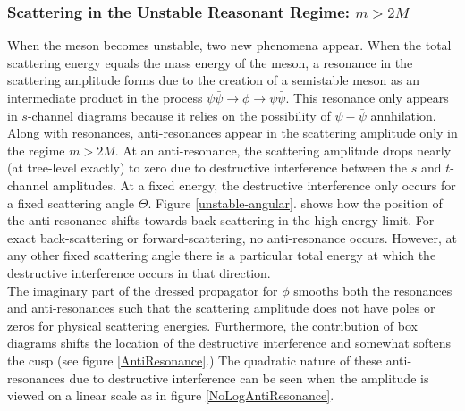 \documentclass{article}
\begin{document}
\subsubsection{Scattering in the Unstable Reasonant Regime: $m > 2 M$}
When the meson becomes unstable, two new phenomena appear. When the total scattering energy equals the mass energy of the meson, a resonance in the scattering amplitude forms due to the creation of a semistable meson as an intermediate product in the process $\psi \bar{\psi} \to \phi \to \psi \bar{\psi}$. This resonance only appears in $s$-channel diagrams because it relies on the possibility of $\psi-\bar{\psi}$ annhilation. Along with resonances, anti-resonances appear in the scattering amplitude only in the regime $m > 2 M$. At an anti-resonance, the scattering amplitude drops nearly (at tree-level exactly) to zero due to destructive interference between the $s$ and $t$-channel amplitudes. At a fixed energy, the destructive interference only occurs for a fixed scattering angle $\Theta$. Figure \ref{unstable-angular}. shows how the position of the anti-resonance shifts towards back-scattering in the high energy limit. For exact back-scattering or forward-scattering, no anti-resonance occurs. However, at any other fixed scattering angle there is a particular total energy at which the destructive interference occurs in that direction.\bigskip\\
The imaginary part of the dressed propagator for $\phi$ smooths both the resonances and anti-resonances such that the scattering amplitude does not have poles or zeros for physical scattering energies. Furthermore, the contribution of box diagrams shifts the location of the destructive interference and somewhat softens the cusp (see figure \ref{AntiResonance}.) The quadratic nature of these anti-resonances due to destructive interference can be seen when the amplitude is viewed on a linear scale as in figure \ref{NoLogAntiResonance}.    
\end{document}
